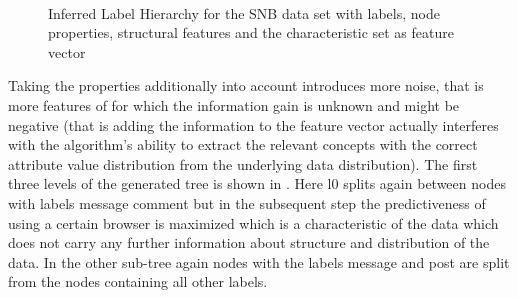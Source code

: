 \begin{figure}[htp]
    \centering
     \\
    \caption{Inferred Label Hierarchy for the SNB data set with labels, node properties, structural features and the characteristic set as feature vector}
    \label{fig:lpscldbctree}
\end{figure}{}
Taking the properties additionally into account introduces more noise, that is more features of for which the information gain is unknown and might be negative (that is adding the information to the feature vector actually interferes with the algorithm's ability to extract the relevant concepts with the correct attribute value distribution from the underlying data distribution). The first three levels of the generated tree is shown in . Here l0 splits again between nodes with labels message comment but in the subsequent step the predictiveness of using a certain browser is maximized which is a characteristic of the data which does not carry any further information about structure and distribution of the data. In the other sub-tree again nodes with the labels message and post are split from the nodes containing all other labels. \\


